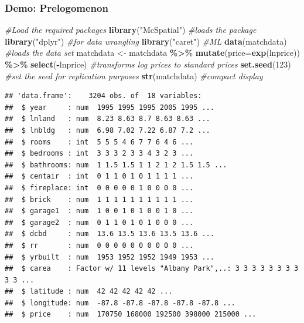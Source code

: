 \documentclass[
  shownotes,
  xcolor={svgnames},
  hyperref={colorlinks,citecolor=DarkBlue,linkcolor=DarkRed,urlcolor=DarkBlue}
  ]{beamer}
\newenvironment{Shaded}{\begin{snugshade}}{\end{snugshade}}
\newcommand{\CommentTok}[1]{\textcolor[rgb]{0.56,0.35,0.01}{\textit{#1}}}
\newcommand{\DataTypeTok}[1]{\textcolor[rgb]{0.13,0.29,0.53}{#1}}
\newcommand{\DecValTok}[1]{\textcolor[rgb]{0.00,0.00,0.81}{#1}}
\newcommand{\KeywordTok}[1]{\textcolor[rgb]{0.13,0.29,0.53}{\textbf{#1}}}
\newcommand{\NormalTok}[1]{#1}
\newcommand{\OperatorTok}[1]{\textcolor[rgb]{0.81,0.36,0.00}{\textbf{#1}}}
\newcommand{\StringTok}[1]{\textcolor[rgb]{0.31,0.60,0.02}{#1}}
\begin{document}
\begin{frame}[fragile]
\frametitle{Demo: Prelogomenon}

\begin{scriptsize}
\begin{Shaded}
\begin{Highlighting}[]
\CommentTok{\#Load the required packages}
\KeywordTok{library}\NormalTok{(}\StringTok{"McSpatial"}\NormalTok{) }\CommentTok{\#loads the package}
\KeywordTok{library}\NormalTok{(}\StringTok{"dplyr"}\NormalTok{) }\CommentTok{\#for data wrangling}
\KeywordTok{library}\NormalTok{(}\StringTok{"caret"}\NormalTok{) }\CommentTok{\#ML}
\KeywordTok{data}\NormalTok{(matchdata) }\CommentTok{\#loads the data set}
\NormalTok{matchdata \textless{}{-}}\StringTok{ }\NormalTok{matchdata }\OperatorTok{\%\textgreater{}\%}\StringTok{ }\KeywordTok{mutate}\NormalTok{(}\DataTypeTok{price=}\KeywordTok{exp}\NormalTok{(lnprice)) }\OperatorTok{\%\textgreater{}\%}\StringTok{ }\KeywordTok{select}\NormalTok{(}\OperatorTok{{-}}\NormalTok{lnprice) }
\CommentTok{\#transforms log prices to standard prices}
\KeywordTok{set.seed}\NormalTok{(}\DecValTok{123}\NormalTok{) }\CommentTok{\#set the seed for replication purposes}
\KeywordTok{str}\NormalTok{(matchdata) }\CommentTok{\#compact display}
\end{Highlighting}
\end{Shaded}
\end{scriptsize}
\begin{tiny}
\begin{verbatim}
## 'data.frame':    3204 obs. of  18 variables:
##  $ year     : num  1995 1995 1995 2005 1995 ...
##  $ lnland   : num  8.23 8.63 8.7 8.63 8.63 ...
##  $ lnbldg   : num  6.98 7.02 7.22 6.87 7.2 ...
##  $ rooms    : int  5 5 5 4 6 7 7 6 4 6 ...
##  $ bedrooms : int  3 3 3 2 3 3 4 3 2 3 ...
##  $ bathrooms: num  1 1.5 1.5 1 1 2 1 2 1.5 1.5 ...
##  $ centair  : int  0 1 1 0 1 0 1 1 1 1 ...
##  $ fireplace: int  0 0 0 0 0 1 0 0 0 0 ...
##  $ brick    : num  1 1 1 1 1 1 1 1 1 1 ...
##  $ garage1  : num  1 0 0 1 0 1 0 0 1 0 ...
##  $ garage2  : num  0 1 1 0 1 0 1 0 0 0 ...
##  $ dcbd     : num  13.6 13.5 13.6 13.5 13.6 ...
##  $ rr       : num  0 0 0 0 0 0 0 0 0 0 ...
##  $ yrbuilt  : num  1953 1952 1952 1949 1953 ...
##  $ carea    : Factor w/ 11 levels "Albany Park",..: 3 3 3 3 3 3 3 3 3 3 ...
##  $ latitude : num  42 42 42 42 42 ...
##  $ longitude: num  -87.8 -87.8 -87.8 -87.8 -87.8 ...
##  $ price    : num  170750 168000 192500 398000 215000 ...
\end{verbatim}
\end{tiny}

\end{frame}
\end{document}
